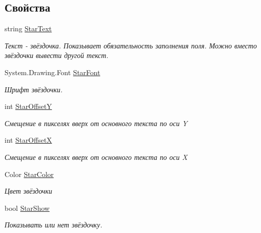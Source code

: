 \subsection*{Свойства}
\begin{DoxyCompactItemize}
\item 
string \mbox{\hyperlink{class_f_b_a_1_1_group_box_f_b_a_aaf77782150fa846197306924fa379d83}{Star\+Text}}
\begin{DoxyCompactList}\small\item\em Текст -\/ звёздочка. Показывает обязательность заполнения поля. Можно вместо звёздочки вывести другой текст. \end{DoxyCompactList}\item 
System.\+Drawing.\+Font \mbox{\hyperlink{class_f_b_a_1_1_group_box_f_b_a_a84c9123f86225450374d1186c0f78872}{Star\+Font}}
\begin{DoxyCompactList}\small\item\em Шрифт звёздочки. \end{DoxyCompactList}\item 
int \mbox{\hyperlink{class_f_b_a_1_1_group_box_f_b_a_ae8496c9635b5da86f0cbc4c5cadfe7ce}{Star\+OffsetY}}
\begin{DoxyCompactList}\small\item\em Смещение в пикселях вверх от основного текста по оси Y \end{DoxyCompactList}\item 
int \mbox{\hyperlink{class_f_b_a_1_1_group_box_f_b_a_af44557a672f9cf5f6640b009e3783baf}{Star\+OffsetX}}
\begin{DoxyCompactList}\small\item\em Смещение в пикселях вверх от основного текста по оси X \end{DoxyCompactList}\item 
Color \mbox{\hyperlink{class_f_b_a_1_1_group_box_f_b_a_ae51565b1f8ec16b73998bb695b07afd8}{Star\+Color}}
\begin{DoxyCompactList}\small\item\em Цвет звёздочки \end{DoxyCompactList}\item 
bool \mbox{\hyperlink{class_f_b_a_1_1_group_box_f_b_a_a58134dedc1a8dc094b9431b8b3d07e13}{Star\+Show}}
\begin{DoxyCompactList}\small\item\em Показывать или нет звёздочку. \end{DoxyCompactList}\end{DoxyCompactItemize}


